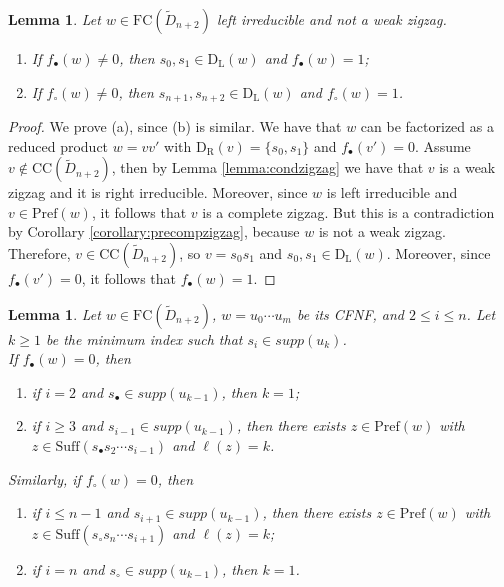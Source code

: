 \documentclass{amsart}
\newcommand{\D}{{\widetilde{D}_{n+2}}}
\newcommand{\ld}{{\mathrm{D}_{\mathrm{L}}}}
\newcommand{\rd}{{\mathrm{D}_{\mathrm{R}}}}
\newcommand{\fc}{{\mathrm{FC}}}
\newcommand{\s}{{s_{\bullet}}}
\newcommand{\sn}{{s_\circ}}
\newcommand{\su}{\mathrm{Suff}}
\newcommand{\pr}{\mathrm{Pref}}
\newcommand{\TTC}{\mathrm{CC}}
\newtheorem{Lemma}[Theorem]{Lemma}
\theoremstyle{definition}
\begin{document}
\begin{Lemma}
\label{lemma:occorrenzeuno}
Let $w\in \fc(\D)$ left irreducible and not a weak zigzag. 
\begin{enumerate}
    \item[(a)] If $f_\bullet(w)\ne 0$, then $s_0,s_1\in \ld(w)$ and $f_\bullet(w)=1$;
    \item[(b)] If $f_\circ(w)\ne 0$, then $s_{n+1},s_{n+2}\in \ld(w)$ and $f_\circ(w)=1$.
\end{enumerate}
\end{Lemma}

\begin{proof}
We prove (a), since (b) is similar. 
We have that $w$ can be factorized as a reduced product $w=vv'$ with $\rd(v)=\{s_0,s_1\}$ and $f_\bullet(v')=0$. Assume $v\notin \TTC(\D)$, then by Lemma \ref{lemma:condzigzag} we have that $v$ is a weak zigzag and it is right irreducible. Moreover, since $w$ is left irreducible and $v\in \pr(w)$, it follows that $v$ is a complete zigzag. But this is a contradiction by Corollary \ref{corollary:precompzigzag}, because $w$ is not a weak zigzag. Therefore, $v\in \TTC(\D)$, so $v=s_0s_1$ and $s_0,s_1\in \ld(w)$. Moreover, since $f_\bullet(v')=0$, it follows that $f_\bullet(w)=1$. 
\end{proof}



\begin{Lemma}
\label{secondlemmanormalform}
Let $w\in \fc(\D)$, $w=u_0\cdots u_m$ be its CFNF, and $2\le i\le n$. Let $k\ge1$ be the minimum index such that $s_i\in supp(u_k)$.\\
If $f_\bullet(w)=0$, then
\begin{enumerate}
    \item[(a)] if $i=2$ and $\s\in supp(u_{k-1})$, then $k=1$;
    \item[(b)] if $i\ge 3$ and $s_{i-1}\in supp(u_{k-1})$, then there exists $z\in \pr(w)$ with $z\in \su(\s s_2\cdots s_{i-1})$ and $\ell(z)=k$.
\end{enumerate}
Similarly, if $f_\circ(w)=0$, then
\begin{enumerate}
    \item[(c)] if $i\le n-1$ and $s_{i+1}\in supp(u_{k-1})$, then there exists $z\in \pr(w)$ with $z\in \su(\sn s_n\cdots s_{i+1})$ and $\ell(z)=k$;
    \item[(d)] if $i=n$ and $\sn \in supp(u_{k-1})$, then $k=1$.
\end{enumerate}
\end{Lemma}
\end{document}
